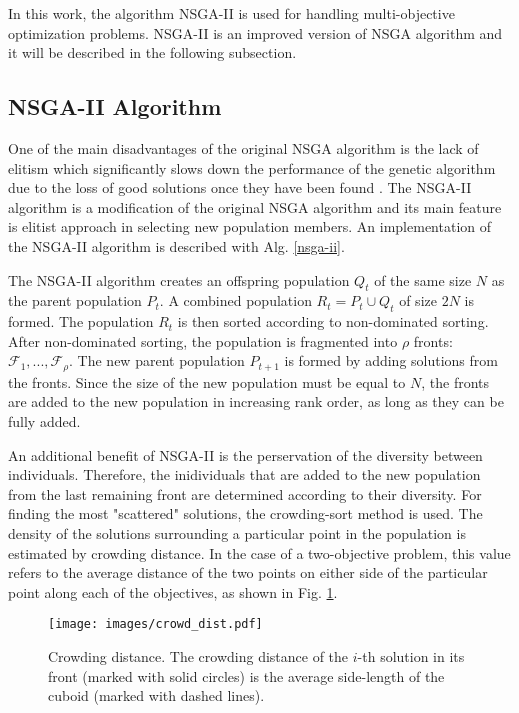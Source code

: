 In this work, the algorithm NSGA-II is used for handling multi-objective optimization problems. 
NSGA-II is an improved version of NSGA algorithm and it will be described in the following subsection. 

\subsection{NSGA-II Algorithm}
One of the main disadvantages of the original NSGA algorithm is the lack of elitism which significantly slows down the performance of the genetic algorithm due to the loss of good solutions once they have been found \cite{deb2000fast}. 
The NSGA-II algorithm is a modification of the original NSGA algorithm and its main feature is elitist approach in selecting new population members. 
An implementation of the NSGA-II algorithm is described with Alg. \ref{nsga-ii}.

The NSGA-II algorithm creates an offspring population $Q_t$ of the same size $N$ as the parent population $P_t$.
A combined population $R_t = P_t \cup Q_t$ of size $2N$ is formed.
The population $R_t$ is then sorted according to non-dominated sorting. 
After non-dominated sorting, the population is fragmented into $\rho$ fronts: $\mathcal{F}_1, ..., \mathcal{F}_\rho$.
The new parent population $P_{t+1}$ is formed by adding solutions from the fronts.
Since the size of the new population must be equal to $N$, the fronts are added to the new population in increasing rank order, as long as they can be fully added.

An additional benefit of NSGA-II is the perservation of the diversity between individuals. 
Therefore, the inidividuals that are added to the new population from the last remaining front are determined according to their diversity. 
For finding the most "scattered" solutions, the crowding-sort method is used. 
The density of the solutions surrounding a particular point in the population is estimated by crowding distance. 
In the case of a two-objective problem, this value refers to the average distance of the two points on either side of the particular point along each of the objectives, as shown in Fig. 
\ref{crowding_dist}. 

\begin{figure}[ht]
    \centering
    \texttt{[image: images/crowd\_dist.pdf]}
    \caption{Crowding distance. The crowding distance of the $i$-th solution in its front (marked with solid circles) is the average side-length of the cuboid (marked with dashed lines). }
    \label{crowding_dist}
\end{figure}

